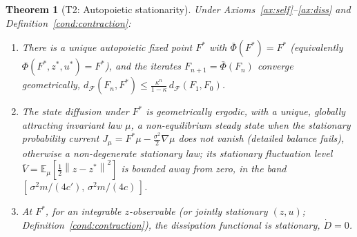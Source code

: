 \documentclass[11pt]{article}
\theoremstyle{plain}
\newtheorem{theorem}{Theorem}[section]
\theoremstyle{definition}
\theoremstyle{remark}
\newcommand{\E}{\mathbb{E}}
\newcommand{\norm}[1]{\left\lVert#1\right\rVert}
\begin{document}
\begin{theorem}[T2: Autopoietic stationarity]\label{thm:t2}
Under Axioms~\ref{ax:self}--\ref{ax:diss} and Definition~\ref{cond:contraction}:
\begin{enumerate}[label=\textnormal{(\roman*)},leftmargin=2.2em]
\item There is a unique autopoietic fixed point $F^*$ with $\bar\Phi(F^*)=F^*$ (equivalently $\Phi(F^*,z^*,u^*)=F^*$), and the iterates $F_{n+1}=\bar\Phi(F_n)$ converge geometrically, $d_{\mathcal F}(F_n,F^*)\le\frac{\kappa^{n}}{1-\kappa}\,d_{\mathcal F}(F_1,F_0)$.
\item The state diffusion under $F^*$ is geometrically ergodic, with a unique, globally attracting invariant law $\mu$, a non-equilibrium steady state when the stationary probability current $J_\mu=F^*\mu-\tfrac{\sigma^2}{2}\nabla\mu$ does not vanish (detailed balance fails), otherwise a non-degenerate stationary law; its stationary fluctuation level $\bar V=\E_\mu[\tfrac12\norm{z-z^*}^2]$ is bounded away from zero, in the band $[\,\sigma^2 m/(4c'),\,\sigma^2 m/(4c)\,]$.
\item At $F^*$, for an integrable $z$-observable (or jointly stationary $(z,u)$; Definition~\ref{cond:contraction}), the dissipation functional is stationary, $\dot D=0$.
\end{enumerate}
\end{theorem}
\end{document}
